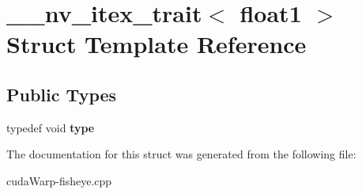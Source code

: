 \hypertarget{struct____nv__itex__trait_3_01float1_01_4}{}\section{\+\_\+\+\_\+nv\+\_\+itex\+\_\+trait$<$ float1 $>$ Struct Template Reference}
\label{struct____nv__itex__trait_3_01float1_01_4}
\subsection*{Public Types}
\begin{DoxyCompactItemize}
\item 
typedef void {\bfseries type}\hypertarget{struct____nv__itex__trait_3_01float1_01_4_a0966c453e7038b739ae50cf64aa5c156}{}\label{struct____nv__itex__trait_3_01float1_01_4_a0966c453e7038b739ae50cf64aa5c156}

\end{DoxyCompactItemize}


The documentation for this struct was generated from the following file\+:\begin{DoxyCompactItemize}
\item 
cuda\+Warp-\/fisheye.\+cpp\end{DoxyCompactItemize}
